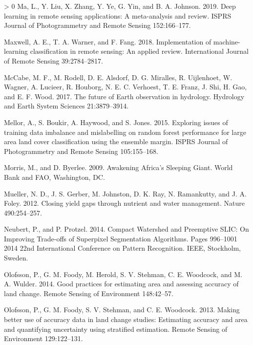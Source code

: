 \documentclass[11pt,a4paper]{article}
\newlength{\cslhangindent}
\newenvironment{CSLReferences}[3] %
 {%
  \setlength{\parindent}{0pt}
  \ifodd #1 \everypar{\setlength{\hangindent}{\cslhangindent}}\ignorespaces\fi
  \ifnum #2 > 0
  \setlength{\parskip}{#2\baselineskip}
  \fi
 }%
 {}
\begin{document}
\begin{CSLReferences}{1}{0}
\leavevmode\hypertarget{ref-maDeepLearningRemote2019}{}%
Ma, L., Y. Liu, X. Zhang, Y. Ye, G. Yin, and B. A. Johnson. 2019. Deep
learning in remote sensing applications: A meta-analysis and review.
ISPRS Journal of Photogrammetry and Remote Sensing 152:166--177.

\leavevmode\hypertarget{ref-MaxwellImplementationmachinelearningclassification2018}{}%
Maxwell, A. E., T. A. Warner, and F. Fang. 2018. Implementation of
machine-learning classification in remote sensing: An applied review.
International Journal of Remote Sensing 39:2784--2817.

\leavevmode\hypertarget{ref-McCabefutureEarthobservation2017}{}%
McCabe, M. F., M. Rodell, D. E. Alsdorf, D. G. Miralles, R. Uijlenhoet,
W. Wagner, A. Lucieer, R. Houborg, N. E. C. Verhoest, T. E. Franz, J.
Shi, H. Gao, and E. F. Wood. 2017. The future of {Earth} observation in
hydrology. Hydrology and Earth System Sciences 21:3879--3914.

\leavevmode\hypertarget{ref-mellorExploringIssuesTraining2015}{}%
Mellor, A., S. Boukir, A. Haywood, and S. Jones. 2015. Exploring issues
of training data imbalance and mislabelling on random forest performance
for large area land cover classification using the ensemble margin.
ISPRS Journal of Photogrammetry and Remote Sensing 105:155--168.

\leavevmode\hypertarget{ref-morrisAwakeningAfricaSleeping2009}{}%
Morris, M., and D. Byerlee. 2009. Awakening {Africa}'s {Sleeping Giant}.
{World Bank and FAO}, {Washington, DC}.

\leavevmode\hypertarget{ref-muellerClosingYieldGaps2012}{}%
Mueller, N. D., J. S. Gerber, M. Johnston, D. K. Ray, N. Ramankutty, and
J. A. Foley. 2012. Closing yield gaps through nutrient and water
management. Nature 490:254--257.

\leavevmode\hypertarget{ref-neubertCompactWatershedPreemptive2014}{}%
Neubert, P., and P. Protzel. 2014. Compact {Watershed} and {Preemptive
SLIC}: On {Improving Trade}-offs of {Superpixel Segmentation
Algorithms}. Pages 996--1001 2014 22nd {International Conference} on
{Pattern Recognition}. {IEEE}, {Stockholm, Sweden}.

\leavevmode\hypertarget{ref-OlofssonGoodpracticesestimating2014}{}%
Olofsson, P., G. M. Foody, M. Herold, S. V. Stehman, C. E. Woodcock, and
M. A. Wulder. 2014. Good practices for estimating area and assessing
accuracy of land change. Remote Sensing of Environment 148:42--57.

\leavevmode\hypertarget{ref-OlofssonMakingbetteruse2013}{}%
Olofsson, P., G. M. Foody, S. V. Stehman, and C. E. Woodcock. 2013.
Making better use of accuracy data in land change studies: Estimating
accuracy and area and quantifying uncertainty using stratified
estimation. Remote Sensing of Environment 129:122--131.


\end{CSLReferences}
\end{document}
